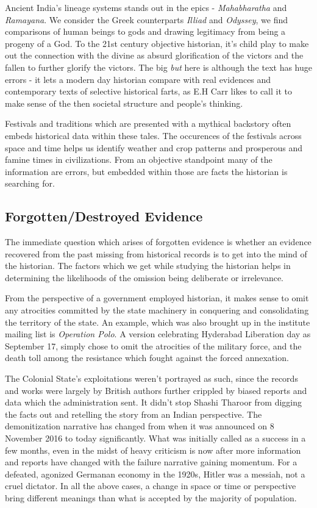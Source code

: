 \documentclass[a4paper]{article}
\begin{document}
Ancient India's lineage systems stands out in the epics -
\emph{Mahabharatha} and \emph{Ramayana}. We consider the Greek
counterparts \emph{Illiad} and \emph{Odyssey}, we find comparisons of
human beings to gods and drawing legitimacy from being a progeny of a
God. To the 21st century objective historian, it's child play to make
out the connection with the divine as absurd glorification of the
victors and the fallen to further glorify the victors. The big
\emph{but} here is although the text has huge errors - it lets a modern
day historian compare with real evidences and contemporary texts of
selective historical farts, as E.H Carr likes to call it\cite[p.
13]{carr1961history} to make sense of the then societal structure and
people's thinking. 

Festivals and traditions which are presented with a mythical backstory
often embeds historical data within these tales. The occurences of the
festivals across space and time helps us identify weather and crop
patterns and prosperous and famine times in civilizations. From an
objective standpoint many of the information are errors, but embedded
within those are facts the historian is searching for. 


\subsection{Forgotten/Destroyed Evidence}

The immediate question which arises of forgotten evidence is whether an
evidence recovered from the past missing from historical records is to
get into the mind of the historian. The factors which we get while
studying the historian helps in determining the likelihoods of the
omission being deliberate or irrelevance.

From the perspective of a government employed historian, it makes sense
to omit any atrocities committed by the state machinery in conquering
and consolidating the territory of the state. An example, which was also
brought up in the institute mailing list is \emph{Operation Polo}. A
version celebrating Hyderabad Liberation day as September 17, simply
chose to omit the atrocities of the military force, and the death toll
among the resistance which fought against the forced annexation.

The Colonial State's exploitations weren't portrayed as such, since the
records and works were largely by British authors further crippled by
biased reports and data which the administration sent. It didn't stop
Shashi Tharoor from digging the facts out and retelling the story from
an Indian perspective.  The demonitization narrative has changed from
when it was announced on 8 November 2016 to today significantly. What
was initially called as a success in a few months, even in the midst of
heavy criticism is now after more information and reports have changed
with the failure narrative gaining momentum.  For a defeated, agonized
Germanan economy in the 1920s, Hitler was a messiah, not a cruel
dictator. In all the above cases, a change in space or time or
perspective bring different meanings than what is accepted by the
majority of population.
\end{document}
